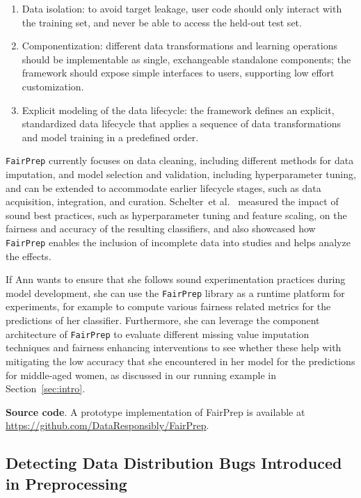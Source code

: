 \documentclass[11pt]{article}
\newcommand{\etal}{et al.\xspace}
\newcommand{\fairprep}{\stt{FairPrep}\xspace}
\newcommand{\header}[1]{\vspace{1mm}\noindent\textbf{#1}.}
\newcommand{\surl}[1]{{\footnotesize\url{#1}}}
\newcommand{\stt}[1]{{\footnotesize\texttt{#1}}}
\begin{document}
\begin{enumerate}
\item Data isolation: to avoid target leakage, user code should only interact with the training set, and never be able to access the held-out test set. 

\item Componentization: different data transformations and learning operations should be implementable as single, exchangeable standalone components; the framework should expose simple interfaces to users, supporting low effort customization. 

\item Explicit modeling of the data lifecycle: the framework defines an explicit, standardized data lifecycle that applies a sequence of data transformations and model training in a predefined order. 
\end{enumerate}

\fairprep  currently focuses on data cleaning, including different methods for data imputation, and model selection and validation, including hyperparameter tuning, and can be extended to accommodate earlier lifecycle stages, such as data acquisition, integration, and curation.   Schelter~\etal~\cite{DBLP:conf/edbt/SchelterHKS20} measured the impact of sound best practices, such as hyperparameter tuning and feature scaling, on the fairness and accuracy of the resulting classifiers, and also showcased how \fairprep enables the inclusion of incomplete data into studies and helps analyze the effects.  

If Ann wants to ensure that she follows sound experimentation practices during model development, she can use the \fairprep library as a runtime platform for experiments, for example to compute various fairness related metrics for the predictions of her classifier. Furthermore, she can leverage the component architecture of \fairprep to evaluate different missing value imputation techniques and fairness enhancing interventions to see whether these help with mitigating the low accuracy that she encountered in her model for the predictions for middle-aged women, as discussed in our running example in Section~\ref{sec:intro}.

\header{Source code} A prototype implementation of FairPrep is available at \surl{https://github.com/DataResponsibly/FairPrep}.

\subsection{Detecting Data Distribution Bugs Introduced in Preprocessing}
\label{sec:mlinspect}
\end{document}
